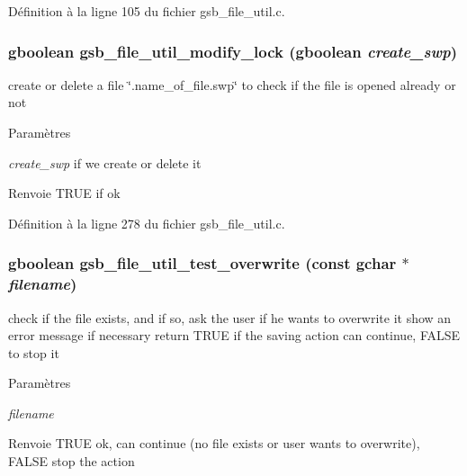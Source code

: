 Définition à la ligne 105 du fichier gsb\_\-file\_\-util.c.

\subsubsection[{gsb\_\-file\_\-util\_\-modify\_\-lock}]{\setlength{\rightskip}{0pt plus 5cm}gboolean gsb\_\-file\_\-util\_\-modify\_\-lock (gboolean {\em create\_\-swp})}\label{gsb__file__util_8c_a80670d5f3bf53ded5ead442f5c6d1be0}
create or delete a file \char`\"{}.name\_\-of\_\-file.swp\char`\"{} to check if the file is opened already or not


\begin{DoxyParams}{Paramètres}
\item[{\em create\_\-swp}]if we create or delete it\end{DoxyParams}
\begin{DoxyReturn}{Renvoie}
TRUE if ok 
\end{DoxyReturn}


Définition à la ligne 278 du fichier gsb\_\-file\_\-util.c.

\subsubsection[{gsb\_\-file\_\-util\_\-test\_\-overwrite}]{\setlength{\rightskip}{0pt plus 5cm}gboolean gsb\_\-file\_\-util\_\-test\_\-overwrite (const gchar $\ast$ {\em filename})}\label{gsb__file__util_8c_af69c587f1e5d21b56fe1c8f53b32565a}
check if the file exists, and if so, ask the user if he wants to overwrite it show an error message if necessary return TRUE if the saving action can continue, FALSE to stop it


\begin{DoxyParams}{Paramètres}
\item[{\em filename}]\end{DoxyParams}
\begin{DoxyReturn}{Renvoie}
TRUE ok, can continue (no file exists or user wants to overwrite), FALSE stop the action 
\end{DoxyReturn}


